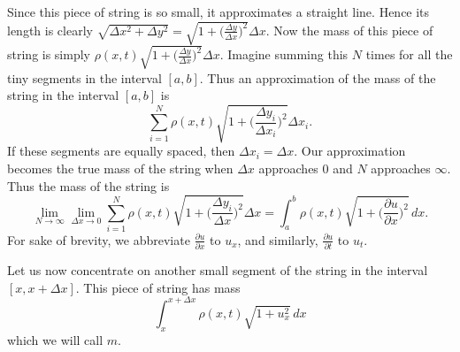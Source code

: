 \documentclass{amsart}
\begin{document}
  Since this piece of string is so small, it approximates a straight line. Hence its length is clearly $\sqrt{\Delta x^2 + \Delta y^2} = \sqrt{1 + \big(\frac{\Delta y}{\Delta x}\big)^2}\Delta x$. Now the mass of this piece of string is simply $\rho(x, t)\sqrt{1 + \big(\frac{\Delta y}{\Delta x}\big)^2}\Delta x$. Imagine summing this $N$ times for all the tiny segments in the interval $[a, b]$. Thus an approximation of the mass of the string  in the interval $[a, b]$ is \[
    \sum_{i=1}^{N} \rho(x, t)\sqrt{1 + \Big(\frac{\Delta y_i}{\Delta x_i}\Big)^2}\Delta x_i
  .\] If these segments are equally spaced, then $\Delta x_i = \Delta x$. Our approximation becomes the true mass of the string when  $\Delta x$ approaches 0 and $N$ approaches $\infty$. Thus the mass of the string is \[
  \lim_{N \to \infty} \lim_{\Delta x \to 0} \sum_{i=1}^{N} \rho(x, t)\sqrt{1 + \Big(\frac{\Delta y_i}{\Delta x}\Big)^2}\Delta x = \int_{a}^{b} \rho(x, t)\sqrt{1 + \Big(\frac{\partial u}{\partial x}\Big)^2}\, dx
.\] For sake of brevity, we abbreviate $\frac{\partial u}{\partial x}$ to  $u_x$, and similarly, $\frac{\partial u}{\partial t}$ to $u_t$.

Let us now concentrate on another small segment of the string in the interval $[x, x + \Delta x]$. This piece of string has mass \[
  \int_{x}^{x+\Delta x} \rho(x, t)\sqrt{1 + u_x^2}\, dx  
\] which we will call $m$.
  \begin{figure}[H]
    \centering
    \caption{}
  \end{figure}
\end{document}
